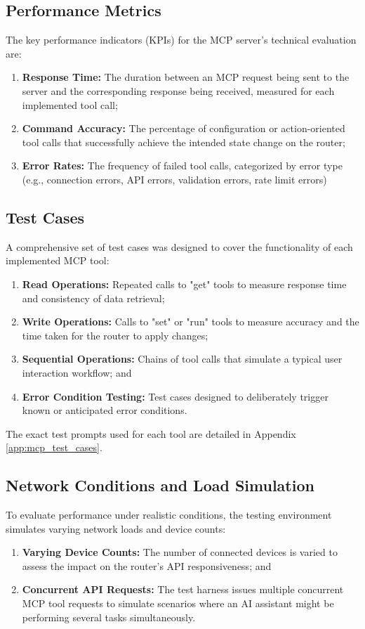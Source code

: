 \subsection{Performance Metrics}
The key performance indicators (KPIs) for the MCP server's technical evaluation are:
\begin{enumerate}
\item \textbf{Response Time:} The duration between an MCP request being sent to the server and the corresponding response being received, measured for each implemented tool call;
\item \textbf{Command Accuracy:} The percentage of configuration or action-oriented tool calls that successfully achieve the intended state change on the router;
\item \textbf{Error Rates:} The frequency of failed tool calls, categorized by error type (e.g., connection errors, API errors, validation errors, rate limit errors)
\end{enumerate}
\subsection{Test Cases}
A comprehensive set of test cases was designed to cover the functionality of each implemented MCP tool:
\begin{enumerate}
\item \textbf{Read Operations:} Repeated calls to "get" tools to measure response time and consistency of data retrieval;
\item \textbf{Write Operations:} Calls to "set" or "run" tools to measure accuracy and the time taken for the router to apply changes;
\item \textbf{Sequential Operations:} Chains of tool calls that simulate a typical user interaction workflow; and
\item \textbf{Error Condition Testing:} Test cases designed to deliberately trigger known or anticipated error conditions.
\end{enumerate}
The exact test prompts used for each tool are detailed in Appendix \ref{app:mcp_test_cases}.
\subsection{Network Conditions and Load Simulation}
To evaluate performance under realistic conditions, the testing environment simulates varying network loads and device counts:
\begin{enumerate}
\item \textbf{Varying Device Counts:} The number of connected devices is varied to assess the impact on the router's API responsiveness; and
\item \textbf{Concurrent API Requests:} The test harness issues multiple concurrent MCP tool requests to simulate scenarios where an AI assistant might be performing several tasks simultaneously.
\end{enumerate}

